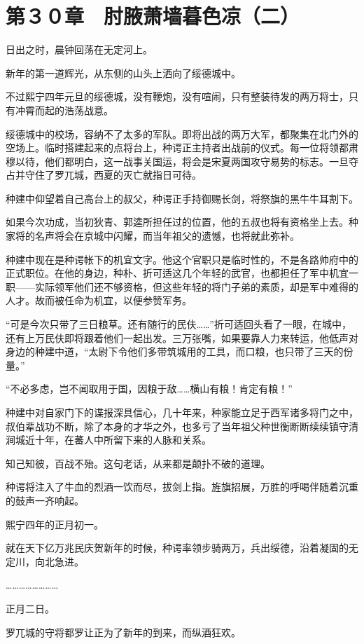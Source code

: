 \section{第３０章　肘腋萧墙暮色凉（二）}

日出之时，晨钟回荡在无定河上。

新年的第一道辉光，从东侧的山头上洒向了绥德城中。

不过熙宁四年元旦的绥德城，没有鞭炮，没有喧闹，只有整装待发的两万将士，只有冲霄而起的浩荡战意。

绥德城中的校场，容纳不了太多的军队。即将出战的两万大军，都聚集在北门外的空场上。临时搭建起来的点将台上，种谔正主持者出战前的仪式。每一位将领都肃穆以待，他们都明白，这一战事关国运，将会是宋夏两国攻守易势的标志。一旦夺占并守住了罗兀城，西夏的灭亡就指日可待。

种建中仰望着自己高台上的叔父，种谔正手持御赐长剑，将祭旗的黑牛牛耳割下。

如果今次功成，当初狄青、郭逵所担任过的位置，他的五叔也将有资格坐上去。种家将的名声将会在京城中闪耀，而当年祖父的遗憾，也将就此弥补。

种建中现在是种谔帐下的机宜文字。他这个官职只是临时性的，不是各路帅府中的正式职位。在他的身边，种朴、折可适这几个年轻的武官，也都担任了军中机宜一职——实际领军他们还不够资格，但这些年轻的将门子弟的素质，却是军中难得的人才。故而被任命为机宜，以便参赞军务。

“可是今次只带了三日粮草。还有随行的民伕……”折可适回头看了一眼，在城中，还有上万民伕即将跟着他们一起出发。三万张嘴，如果要靠人力来转运，他低声对身边的种建中道，“太尉下令他们多带筑城用的工具，而口粮，也只带了三天的份量。”

“不必多虑，岂不闻取用于国，因粮于敌……横山有粮！肯定有粮！”

种建中对自家门下的谍报深具信心，几十年来，种家能立足于西军诸多将门之中，叔伯辈战功不断，除了本身的才华之外，也多亏了当年祖父种世衡断断续续镇守清涧城近十年，在蕃人中所留下来的人脉和关系。

知己知彼，百战不殆。这句老话，从来都是颠扑不破的道理。

种谔将注入了牛血的烈酒一饮而尽，拔剑上指。旌旗招展，万胜的呼喝伴随着沉重的鼓声一齐响起。

熙宁四年的正月初一。

就在天下亿万兆民庆贺新年的时候，种谔率领步骑两万，兵出绥德，沿着凝固的无定川，向北急进。

……………………

正月二日。

罗兀城的守将都罗让正为了新年的到来，而纵酒狂欢。

